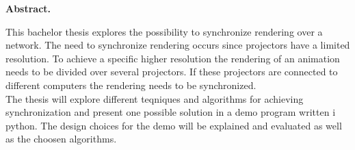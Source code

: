 \mbox{}
\vspace{3cm}
\begin{center}
\begin{minipage}[center]{0.80\textwidth}

\begin{center}
{\normalsize \textbf{Abstract.}}
\end{center}
This bachelor thesis explores the possibility to synchronize rendering over a network. The need to synchronize rendering occurs since projectors have a limited resolution. To achieve a specific higher resolution the rendering of an animation needs to be divided over several projectors. If these projectors are connected to different computers the rendering needs to be synchronized. 
\\

The thesis will explore different teqniques and algorithms for achieving synchronization and present one possible solution in a demo program written i python. The design choices for the demo will be explained and evaluated as well as the choosen algorithms. 
\end{minipage}
\end{center}
